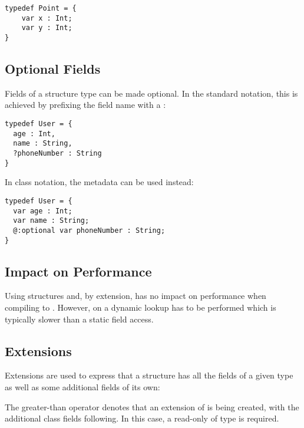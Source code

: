 \begin{lstlisting}
typedef Point = {
    var x : Int;
    var y : Int;
}
\end{lstlisting}

\subsection{Optional Fields}
\label{types-structure-optional-fields}

Fields of a structure type can be made optional. In the standard notation, this is achieved by prefixing the field name with a :

\begin{lstlisting}
typedef User = {
  age : Int,
  name : String,
  ?phoneNumber : String
}
\end{lstlisting}

In class notation, the  metadata can be used instead:

\begin{lstlisting}
typedef User = {
  var age : Int;
  var name : String;
  @:optional var phoneNumber : String;
}
\end{lstlisting}




\subsection{Impact on Performance}
\label{types-structure-performance}

Using structures and, by extension,  has no impact on performance when compiling to . However, on  a dynamic lookup has to be performed which is typically slower than a static field access.

\subsection{Extensions}
\label{types-structure-extensions}

Extensions are used to express that a structure has all the fields of a given type as well as some additional fields of its own:

The greater-than operator \expr{>} denotes that an extension of  is being created, with the additional class fields following. In this case, a read-only   of type  is required.

